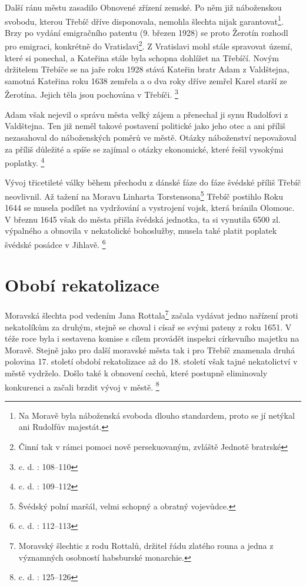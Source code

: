 \documentclass[a4paper,oneside,12p]{report}
\begin{document}
Další ránu městu zasadilo Obnovené zřízení zemské.
Po něm již náboženskou svobodu, kterou Třebíč dříve disponovala,  nemohla šlechta nijak garantovat\footnote{Na Moravě byla náboženská svoboda dlouho standardem, proto se jí netýkal ani Rudolfův majestát.}.
Brzy po vydání emigračního patentu (9. březen 1928) se proto Žerotín rozhodl pro emigraci, konkrétně do Vratislavi\footnote{Činní tak v rámci pomoci nově persekuovaným, zvláště Jednotě bratrské}.
Z Vratislavi mohl stále spravovat území, které si ponechal, a Kateřina stále byla schopna dohlížet na Třebíčí.
Novým držitelem Třebíče se na jaře roku 1928 stává Kateřin bratr Adam z Valdštejna, samotná Kateřina roku 1638 zemřela a o dva roky dříve zemřel Karel starší ze Žerotína. %
Jejich těla jsou pochována v Třebíči. \footnote{c. d. : 108--110}

Adam však nejevil o správu města velký zájem a přenechal ji synu Rudolfovi z Valdštejna.
Ten již neměl takové postavení politické jako jeho otec a ani příliš nezasahoval do náboženských poměrů ve městě.
Otázky náboženství nepovažoval za příliš důležité a spíše se zajímal o otázky ekonomické, které řešil vysokými poplatky. \footnote{c. d. : 109--112}

Vývoj třicetileté války během přechodu z dánské fáze do fáze švédské příliš Třebíč neovlivnil.
Až tažení na Moravu Linharta Torstensona\footnote{Švédský polní maršál, velmi schopný a obratný vojevůdce.} Třebíč postihlo
Roku 1644 se musela podílet na vydržování a vystrojení vojsk, která bránila Olomouc.
V březnu 1645 však do města přišla švédská jednotka, ta si vynutila 6500 zl. výpalného a obnovila v nekatolické bohoslužby, musela také platit poplatek švédské posádce v Jihlavě. \footnote{c. d. : 112--113}

\section{Obobí rekatolizace}

Moravská šlechta pod vedením Jana Rottala\footnote{Moravský šlechtic z rodu Rottalů, držitel řádu zlatého rouna a jedna z významných osobností habsburské monarchie.} začala vydávat jedno nařízení proti nekatolíkům za druhým, stejně se choval i císař se svými pateny z roku 1651.
V téže roce byla i sestavena komise s cílem provádět inspekci církevního majetku na Moravě.
Stejně jako pro další moravské města tak i pro Třebíč znamenala druhá polovina 17. století období rekatolizace až do 18. století však tajné nekatolictví v městě vydrželo.
Došlo také k obnovení cechů, které postupně eliminovaly konkurenci a začali brzdit vývoj v městě. \footnote{c. d. : 125--126}
\end{document}
